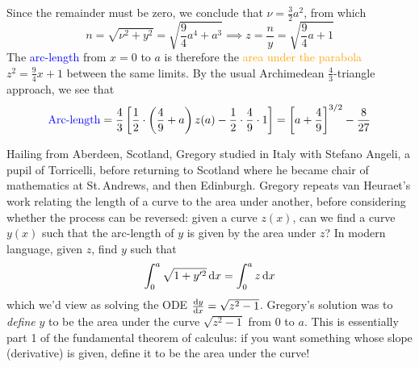 Since the remainder must be zero, we conclude that $\nu=\frac 32a^2$, from which
\[n=\sqrt{\nu^2+y^2}=\sqrt{\frac 94a^4+a^3}\implies z=\frac ny=\sqrt{\frac 94a+1}\]
The \textcolor{blue}{arc-length} from $x=0$ to $a$ is therefore the \textcolor{orange}{area under the parabola} $z^2=\frac 94x+1$ between the same limits. By the usual Archimedean $\frac 43$-triangle approach, we see that
\[\text{\textcolor{blue}{Arc-length}}=\frac 43\left[\frac 12\cdot\left(\frac 49+a\right)z(a)-\frac 12\cdot \frac 49\cdot 1\right] =\left[a+\frac 49\right]^{3/2}-\frac 8{27}\]

 Hailing from Aberdeen, Scotland, Gregory studied in Italy with Stefano Angeli, a pupil of Torricelli, before returning to Scotland where he became chair of mathematics at St.\,Andrews, and then Edinburgh.\smallbreak
Gregory repeats van Heuraet's work relating the length of a curve to the area under another, before considering whether the process can be reversed: given a curve $z(x)$, can we find a curve $y(x)$ such that the arc-length of $y$ is given by the area under $z$? In modern language, given $z$, find $y$ such that
\[\int_0^a\sqrt{1+y'^2}\,\dx=\int_0^az\,\dx\]
which we'd view as solving the ODE $\diff[y]{x}=\sqrt{z^2-1}$. Gregory's solution was to \emph{define} $y$ to be the area under the curve $\sqrt{z^2-1}$ from $0$ to $a$. This is essentially part 1 of the fundamental theorem of calculus: if you want something whose slope (derivative) is given, define it to be the area under the curve!

\goodbreak

